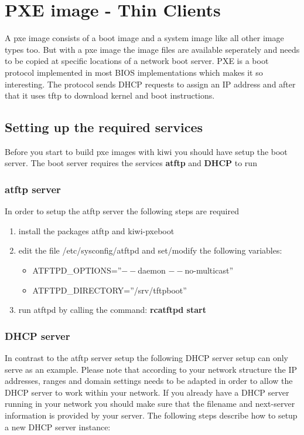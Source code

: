 \chapter{PXE image - Thin Clients}
\label{chapter:pxe}
\minitoc

A pxe image consists of a boot image and a system image like all other
 image types too. But with a pxe image the image files are available
seperately and needs to be copied at specific locations of a network
boot server. PXE is a boot protocol implemented in most BIOS implementations
which makes it so interesting. The protocol sends DHCP requests to assign
an IP address and after that it uses tftp to download kernel and boot
instructions. 

\section{Setting up the required services}

Before you start to build pxe images with kiwi you
should have setup the boot server. The boot server requires the
services \textbf{atftp} and \textbf{DHCP} to run

\subsection{atftp server}

In order to setup the atftp server the following steps are required

\begin{enumerate}
\item install the packages atftp and kiwi-pxeboot
\item edit the file /etc/sysconfig/atftpd and set/modify the following
      variables:
      \begin{itemize}
      \item ATFTPD\_OPTIONS=''$--$daemon $--$no-multicast''
      \item ATFTPD\_DIRECTORY=''/srv/tftpboot''
      \end{itemize}
\item run atftpd by calling the command:
      \textbf{rcatftpd start}
\end{enumerate}

\subsection{DHCP server}

In contrast to the atftp server setup the following DHCP server setup
can only serve as an example. Please note that according to your network
structure the IP addresses, ranges and domain settings needs to be adapted
in order to allow the DHCP server to work within your network. If you
already have a DHCP server running in your network you should make sure
that the filename and next-server information is provided by your server.
The following steps describe how to setup a new DHCP server instance:

